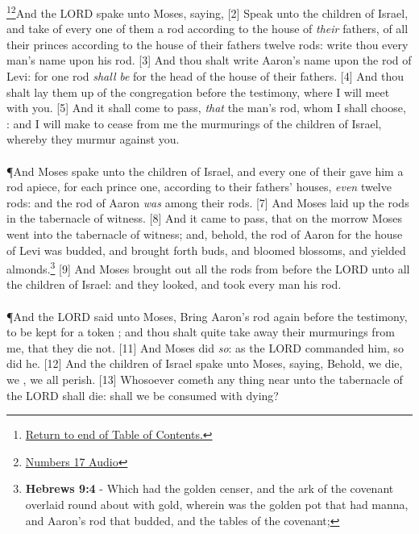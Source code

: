 \footnote{\textcolor[cmyk]{0.99998,1,0,0}{\hyperlink{TOC}{Return to end of Table of Contents.}}}\footnote{\href{https://audiobible.com/bible/numbers_17.html}{\textcolor[cmyk]{0.99998,1,0,0}{Numbers 17 Audio}}}\textcolor[cmyk]{0.99998,1,0,0}{And the LORD spake unto Moses, saying,}
[2] \textcolor[cmyk]{0.99998,1,0,0}{Speak unto the children of Israel, and take of every one of them a rod according to the house of \emph{their} fathers, of all their princes according to the house of their fathers twelve rods: write thou every man's name upon his rod.}
[3] \textcolor[cmyk]{0.99998,1,0,0}{And thou shalt write Aaron's name upon the rod of Levi: for one rod \emph{shall} \emph{be} for the head of the house of their fathers.}
[4] \textcolor[cmyk]{0.99998,1,0,0}{And thou shalt lay them up  of the congregation before the testimony, where I will meet with you.}
[5] \textcolor[cmyk]{0.99998,1,0,0}{And it shall come to pass, \emph{that} the man's rod, whom I shall choose, : and I will make to cease from me the murmurings of the children of Israel, whereby they murmur against you.}\\
\\
\P \textcolor[cmyk]{0.99998,1,0,0}{And Moses spake unto the children of Israel, and every one of their  gave him a rod apiece, for each prince one, according to their fathers' houses, \emph{even} twelve rods: and the rod of Aaron \emph{was} among their rods.}
[7] \textcolor[cmyk]{0.99998,1,0,0}{And Moses laid up the rods  in the tabernacle of witness.}
[8] \textcolor[cmyk]{0.99998,1,0,0}{And it came to pass, that on the morrow Moses went into the tabernacle of witness; and, behold, the rod of Aaron for the house of Levi was budded, and brought forth buds, and bloomed blossoms, and yielded almonds.}\footnote{\textbf{Hebrews 9:4} - Which had the golden censer, and the ark of the covenant overlaid round about with gold, wherein was the golden pot that had manna, and Aaron’s rod that budded, and the tables of the covenant;}
[9] \textcolor[cmyk]{0.99998,1,0,0}{And Moses brought out all the rods from before the LORD unto all the children of Israel: and they looked, and took every man his rod.}\\
\\
\P \textcolor[cmyk]{0.99998,1,0,0}{And the LORD said unto Moses, Bring Aaron's rod again before the testimony, to be kept for a token ; and thou shalt quite take away their murmurings from me, that they die not.}
[11] \textcolor[cmyk]{0.99998,1,0,0}{And Moses did \emph{so}: as the LORD commanded him, so did he.}
[12] \textcolor[cmyk]{0.99998,1,0,0}{And the children of Israel spake unto Moses, saying, Behold, we die, we , we all perish.}
[13] \textcolor[cmyk]{0.99998,1,0,0}{Whosoever cometh any thing near unto the tabernacle of the LORD shall die: shall we be consumed with dying?}